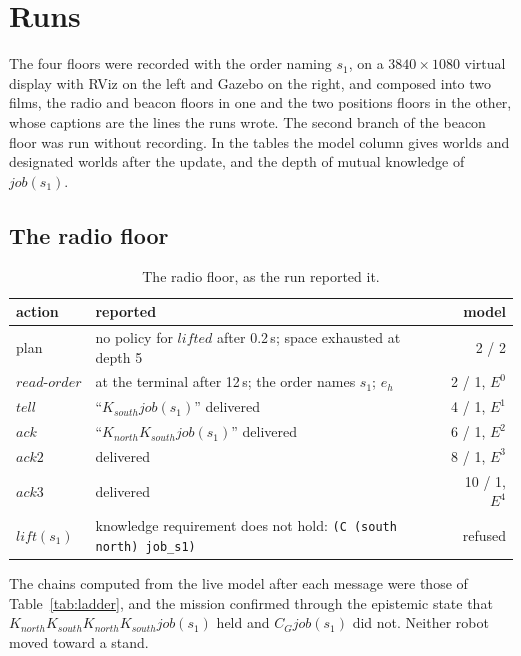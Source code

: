 \documentclass[11pt,a4paper]{article}
\theoremstyle{definition}
\newcommand{\Kop}[1]{K_{#1}}
\newcommand{\Cop}[1]{C_{#1}}
\newcommand{\code}[1]{\texttt{\small #1}}
\newcommand{\job}{\mathit{job}}
\begin{document}
\section{Runs}
\label{sec:runs}

The four floors were recorded with the order naming $s_1$, on a
$3840 \times 1080$ virtual display with RViz on the left and Gazebo on the
right, and composed into two films, the radio and beacon floors in one and the
two positions floors in the other, whose captions are the lines the runs wrote.
The second branch of the beacon floor was run without recording. In the tables
the model column gives worlds and designated worlds after the update, and the
depth of mutual knowledge of $\job(s_1)$.

\subsection{The radio floor}

\begin{table}[H]
\centering\small
\caption{The radio floor, as the run reported it.}
\label{tab:radio-run}
\begin{tabularx}{\textwidth}{@{}l X r@{}}
\toprule
action & reported & model \\
\midrule
plan & no policy for $\mathit{lifted}$ after 0.2\,s; space exhausted at depth 5 & 2 / 2 \\
$\mathit{read\text{-}order}$ & at the terminal after 12\,s; the order names $s_1$; $e_h$ & 2 / 1, $E^0$ \\
$\mathit{tell}$ & ``$\Kop{south}\job(s_1)$'' delivered & 4 / 1, $E^1$ \\
$\mathit{ack}$ & ``$\Kop{north}\Kop{south}\job(s_1)$'' delivered & 6 / 1, $E^2$ \\
$\mathit{ack2}$ & delivered & 8 / 1, $E^3$ \\
$\mathit{ack3}$ & delivered & 10 / 1, $E^4$ \\
$\mathit{lift}(s_1)$ & knowledge requirement does not hold: \code{(C (south north) job\_s1)} & refused \\
\bottomrule
\end{tabularx}
\end{table}

\noindent
The chains computed from the live model after each message were those of
Table~\ref{tab:ladder}, and the mission confirmed through the epistemic state
that $\Kop{north}\Kop{south}\Kop{north}\Kop{south}\job(s_1)$ held and
$\Cop{G}\job(s_1)$ did not. Neither robot moved toward a stand.
\end{document}
